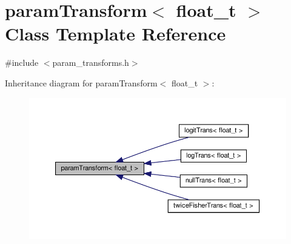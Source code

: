 \hypertarget{classparamTransform}{}\section{param\+Transform$<$ float\+\_\+t $>$ Class Template Reference}
\label{classparamTransform}


{\ttfamily \#include $<$param\+\_\+transforms.\+h$>$}



Inheritance diagram for param\+Transform$<$ float\+\_\+t $>$\+:\nopagebreak
\begin{figure}[H]
\begin{center}
\leavevmode
\includegraphics[width=350pt]{classparamTransform__inherit__graph}
\end{center}
\end{figure}
